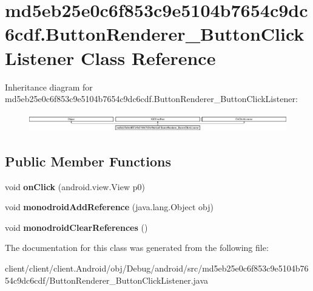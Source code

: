 \hypertarget{classmd5eb25e0c6f853c9e5104b7654c9dc6cdf_1_1ButtonRenderer__ButtonClickListener}{}\section{md5eb25e0c6f853c9e5104b7654c9dc6cdf.\+Button\+Renderer\+\_\+\+Button\+Click\+Listener Class Reference}
\label{classmd5eb25e0c6f853c9e5104b7654c9dc6cdf_1_1ButtonRenderer__ButtonClickListener}
Inheritance diagram for md5eb25e0c6f853c9e5104b7654c9dc6cdf.\+Button\+Renderer\+\_\+\+Button\+Click\+Listener\+:\begin{figure}[H]
\begin{center}
\leavevmode
\includegraphics[height=0.797721cm]{classmd5eb25e0c6f853c9e5104b7654c9dc6cdf_1_1ButtonRenderer__ButtonClickListener}
\end{center}
\end{figure}
\subsection*{Public Member Functions}
\begin{DoxyCompactItemize}
\item 
\hypertarget{classmd5eb25e0c6f853c9e5104b7654c9dc6cdf_1_1ButtonRenderer__ButtonClickListener_a62f2305ea75e27775a4b5fb3c9db649d}{}void {\bfseries on\+Click} (android.\+view.\+View p0)\label{classmd5eb25e0c6f853c9e5104b7654c9dc6cdf_1_1ButtonRenderer__ButtonClickListener_a62f2305ea75e27775a4b5fb3c9db649d}

\item 
\hypertarget{classmd5eb25e0c6f853c9e5104b7654c9dc6cdf_1_1ButtonRenderer__ButtonClickListener_a2c8a471ad15e566b50a2b77084642669}{}void {\bfseries monodroid\+Add\+Reference} (java.\+lang.\+Object obj)\label{classmd5eb25e0c6f853c9e5104b7654c9dc6cdf_1_1ButtonRenderer__ButtonClickListener_a2c8a471ad15e566b50a2b77084642669}

\item 
\hypertarget{classmd5eb25e0c6f853c9e5104b7654c9dc6cdf_1_1ButtonRenderer__ButtonClickListener_a9cab8e96fe45d5c1cae2f17fe1bee770}{}void {\bfseries monodroid\+Clear\+References} ()\label{classmd5eb25e0c6f853c9e5104b7654c9dc6cdf_1_1ButtonRenderer__ButtonClickListener_a9cab8e96fe45d5c1cae2f17fe1bee770}

\end{DoxyCompactItemize}


The documentation for this class was generated from the following file\+:\begin{DoxyCompactItemize}
\item 
client/client/client.\+Android/obj/\+Debug/android/src/md5eb25e0c6f853c9e5104b7654c9dc6cdf/Button\+Renderer\+\_\+\+Button\+Click\+Listener.\+java\end{DoxyCompactItemize}
